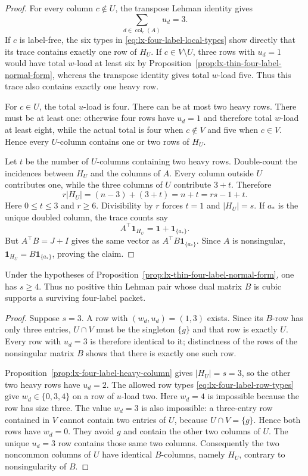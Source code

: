 \begin{proof}
For every column $c\notin U$, the transpose Lehman identity gives
\[
 \sum_{d\in\operatorname{col}_c(A)}u_d=3.
\]
If $c$ is label-free, the six types in
\eqref{eq:lx-four-label-local-types} show directly that its trace contains
exactly one row of $H_U$.  If $c\in V\setminus U$, three rows with $u_d=1$
would have total $w$-load at least six by
Proposition~\ref{prop:lx-thin-four-label-normal-form}, whereas the transpose
identity gives total $w$-load five.  Thus this trace also contains exactly
one heavy row.

For $c\in U$, the total $u$-load is four.  There can be at most two heavy
rows.  There must be at least one: otherwise four rows have $u_d=1$ and
therefore total $w$-load at least eight, while the actual total is four when
$c\notin V$ and five when $c\in V$.  Hence every $U$-column contains one or
two rows of $H_U$.

Let $t$ be the number of $U$-columns containing two heavy rows.  Double-count
the incidences between $H_U$ and the columns of $A$.  Every column outside
$U$ contributes one, while the three columns of $U$ contribute $3+t$.
Therefore
\[
 r|H_U|=(n-3)+(3+t)=n+t=rs-1+t.                   \tag{LH-4f}
 \label{eq:lx-four-label-heavy-count}
\]
Here $0\leq t\leq3$ and $r\geq6$.  Divisibility by $r$ forces $t=1$ and
$|H_U|=s$.  If $a_*$ is the unique doubled column, the trace counts say
\[
 A^\top\mathbf1_{H_U}=\mathbf1+\mathbf1_{\{a_*\}}.
\]
But $A^\top B=J+I$ gives the same vector as
$A^\top B\mathbf1_{\{a_*\}}$.  Since $A$ is nonsingular,
$\mathbf1_{H_U}=B\mathbf1_{\{a_*\}}$, proving the claim.
\end{proof}

\begin{corollary}
\label{cor:lx-four-label-dual-cubic-exclusion}
Under the hypotheses of
Proposition~\ref{prop:lx-thin-four-label-normal-form}, one has $s\geq4$.
Thus no positive thin Lehman pair whose dual matrix $B$ is cubic supports a
surviving four-label packet.
\end{corollary}

\begin{proof}
Suppose $s=3$.  A row with $(w_d,u_d)=(1,3)$ exists.  Since its $B$-row has
only three entries, $U\cap V$ must be the singleton $\{g\}$ and that row is
exactly $U$.  Every row with $u_d=3$ is therefore identical to it; distinctness
of the rows of the nonsingular matrix $B$ shows that there is exactly one such
row.

Proposition~\ref{prop:lx-four-label-heavy-column} gives $|H_U|=s=3$, so the
other two heavy rows have $u_d=2$.  The allowed row types
\eqref{eq:lx-four-label-row-types} give $w_d\in\{0,3,4\}$ on a row of
$u$-load two.  Here $w_d=4$ is impossible because the row has size three.
The value $w_d=3$ is also impossible: a three-entry row contained in $V$
cannot contain two entries of $U$, because $U\cap V=\{g\}$.  Hence both rows
have $w_d=0$.  They avoid $g$ and contain the other two columns of $U$.
The unique $u_d=3$ row contains those same two columns.  Consequently the two
noncommon columns of $U$ have identical $B$-columns, namely $H_U$, contrary
to nonsingularity of $B$.
\end{proof}

